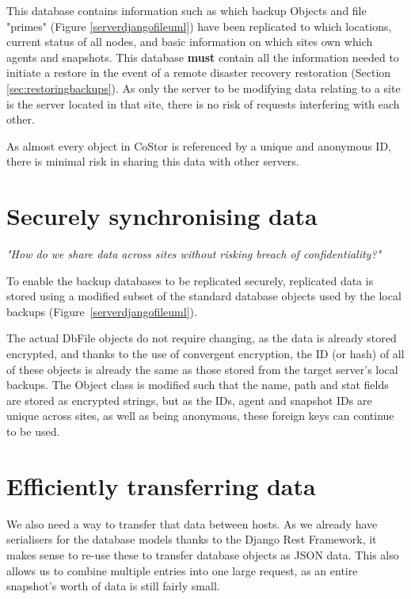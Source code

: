 \documentclass[bsc,frontabs,twoside,singlespacing,parskip,deptreport]{infthesis}     %
\begin{document}
This database contains information such as which backup Objects and file "primes" 
(Figure \ref{serverdjangofileuml}) have been replicated to which locations, current status of all
nodes, and basic information on which sites own which agents and snapshots. This database 
\textbf{must} contain all the information needed to initiate a restore in the event of a remote 
disaster recovery restoration (Section \ref{sec:restoringbackups}). As only the server to
be modifying data relating to a site is the server located in that site, there is no risk of 
requests interfering with each other.

As almost every object in CoStor is referenced by a unique and anonymous ID, there is minimal 
risk in sharing this data with other servers.

\section{Securely synchronising data}

\large \textit{"How do we share data across sites without risking breach of confidentiality?"}
\normalsize

To enable the backup databases to be replicated securely, replicated data is stored using a modified
subset of the standard database objects used by the local backups (Figure~\ref{serverdjangofileuml}).

The actual DbFile objects do not require changing, as the data is already stored encrypted, and thanks
to the use of convergent encryption, the ID (or hash) of all of these objects is already the same as
those stored from the target server's local backups. The Object class is modified such that the name,
path and stat fields are stored as encrypted strings, but as the IDs, agent and snapshot IDs are unique
across sites, as well as being anonymous, these foreign keys can continue to be used.

\section{Efficiently transferring data}

We also need a way to transfer that data between hosts. As we already have serialisers for the 
database models thanks to the Django Rest Framework, it makes sense to re-use these to transfer 
database objects as JSON data. This also allows us to combine multiple entries into one large
request, as an entire snapshot's worth of data is still fairly small.
\end{document}
